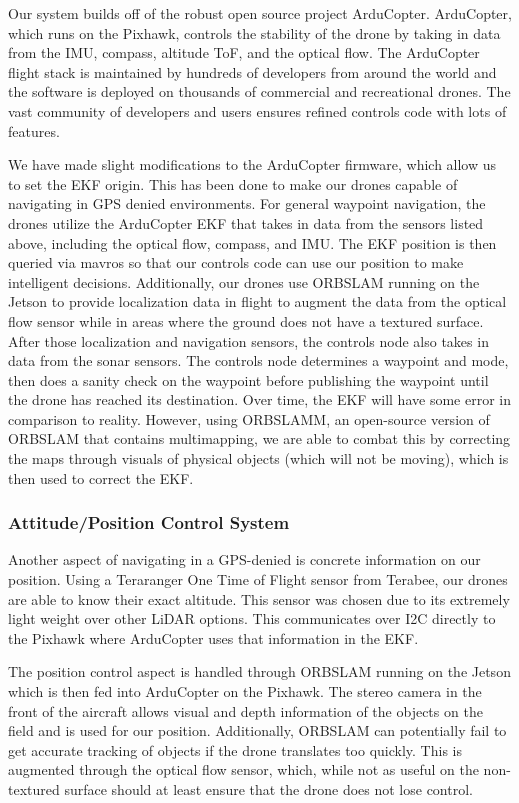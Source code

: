 \documentclass[12pt,letterpaper]{article}
\begin{document}
			Our system builds off of the robust open source project ArduCopter. ArduCopter, which runs on the Pixhawk, controls the stability of the drone by taking in data from the IMU, compass, altitude ToF, and the optical flow. The ArduCopter flight stack is maintained by hundreds of developers from around the world and the software is deployed on thousands of commercial and recreational drones. The vast community of developers and users ensures refined controls code with lots of features.

			We have made slight modifications to the ArduCopter firmware, which allow us to set the EKF origin. This has been done to make our drones capable of navigating in GPS denied environments. For general waypoint navigation, the drones utilize the ArduCopter EKF that takes in data from the sensors listed above, including the optical flow, compass, and IMU. The EKF position is then queried via mavros so that our controls code can use our position to make intelligent decisions. Additionally, our drones use ORBSLAM running on the Jetson to provide localization data in flight to augment the data from the optical flow sensor while in areas where the ground does not have a textured surface. After those localization and navigation sensors, the controls node also takes in data from the sonar sensors. The controls node determines a waypoint and mode, then does a sanity check on the waypoint before publishing the waypoint until the drone has reached its destination. Over time, the EKF will have some error in comparison to reality. However, using ORBSLAMM, an open-source version of ORBSLAM that contains multimapping, we are able to combat this by correcting the maps through visuals of physical objects (which will not be moving), which is then used to correct the EKF. 
			
		\subsubsection*{Attitude/Position Control System}
		
			Another aspect of navigating in a GPS-denied is concrete information on our position. Using a Teraranger One Time of Flight sensor from Terabee, our drones are able to know their exact altitude. This sensor was chosen due to its extremely light weight over other LiDAR options. This communicates over I2C directly to the Pixhawk where ArduCopter uses that information in the EKF. 
			
			The position control aspect is handled through ORBSLAM running on the Jetson which is then fed into ArduCopter on the Pixhawk. The stereo camera in the front of the aircraft allows visual and depth information of the objects on the field and is used for our position. Additionally, ORBSLAM can potentially fail to get accurate tracking of objects if the drone translates too quickly. This is augmented through the optical flow sensor, which, while not as useful on the non-textured surface should at least ensure that the drone does not lose control. 
\end{document}

